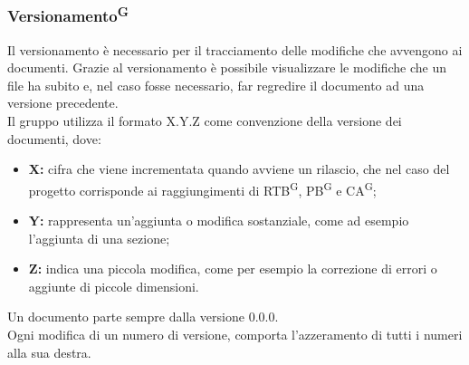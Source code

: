 \documentclass[8pt]{article}
\newcommand{\glossterm}[1]{#1\textsuperscript{G}} %
\begin{document}
\subsubsection{\glossterm{Versionamento}}

Il versionamento è necessario per il tracciamento delle modifiche che avvengono ai documenti. Grazie al versionamento è possibile visualizzare le modifiche che un file ha subito e, nel caso fosse necessario, far regredire il documento ad una versione precedente. \\
Il gruppo utilizza il formato X.Y.Z come convenzione della versione dei documenti, dove:
\begin{itemize}
    \item \textbf{X:} cifra che viene incrementata quando avviene un rilascio, che nel caso del progetto corrisponde ai raggiungimenti di \glossterm{RTB}, \glossterm{PB} e \glossterm{CA};
    \item \textbf{Y:} rappresenta un'aggiunta o modifica sostanziale, come ad esempio l'aggiunta di una sezione;
    \item \textbf{Z:} indica una piccola modifica, come per esempio la correzione di errori o aggiunte di piccole dimensioni.
\end{itemize}
Un documento parte sempre dalla versione 0.0.0. \\
Ogni modifica di un numero di versione, comporta l'azzeramento di tutti i numeri alla sua destra.
\end{document}
